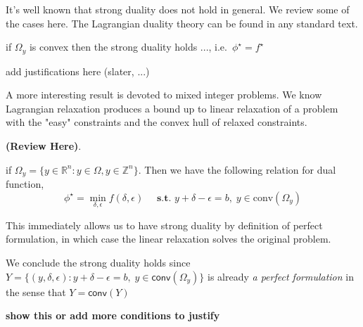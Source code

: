 \documentclass[../main]{subfiles}
\begin{document}
It's well known that strong duality does not hold in general. We review
some of the cases here. The Lagrangian duality theory can be found in
any standard text.

\begin{theorem}
  if \(\Omega_y\) is convex then the strong duality holds ...,
  i.e.~\(\phi^\star = f^\star\)
\end{theorem}

add justifications here (slater, ...)

A more interesting result is devoted to mixed integer problems.
We know Lagrangian relaxation produces a bound up to
linear relaxation of a problem with the "easy" constraints
and the convex hull of relaxed constraints.

\textbf{(Review Here)}.

\begin{lemma}
  if \(\Omega_y = \{y \in \mathbb R^n: y \in \Omega, y\in \mathbb Z^n\}\).
  Then we have the following relation for dual function,
  \[ \phi^\star = \min_{\delta, \epsilon} f(\delta, \epsilon)\quad \textbf{ s.t. }  y + \delta - \epsilon = b,\; y \in \textrm{conv}(\Omega_y)\]
\end{lemma}

This immediately allows us to have strong duality by definition of perfect formulation,
in which case the linear relaxation solves the original problem.

\begin{corollary}\label{strong-ip}
  We conclude the strong duality holds since
  \(Y = \{(y, \delta, \epsilon): y + \delta - \epsilon = b,\; y \in \textsf{conv}(\Omega_y)\}\)
  is already \emph{a perfect formulation} in the sense that
  \(Y = \textsf{conv}(Y)\)
\end{corollary}

\textbf{show this or add more conditions to
  justify}
\end{document}
